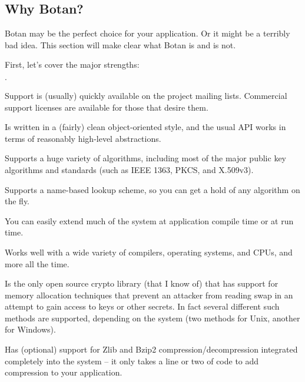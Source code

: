 \documentclass{article}
\begin{document}
\subsection{Why Botan?}

Botan may be the perfect choice for your application. Or it might be a
terribly bad idea. This section will make clear what Botan is
and is not.

First, let's cover the major strengths:

\begin{list}{$\cdot$}
  \item Support is (usually) quickly available on the project mailing lists.
        Commercial support licenses are available for those that desire them.

  \item
  \item Is written in a (fairly) clean object-oriented style, and the usual
        API works in terms of reasonably high-level abstractions.

  \item Supports a huge variety of algorithms, including most of the major
        public key algorithms and standards (such as IEEE 1363, PKCS, and
        X.509v3).

  \item Supports a name-based lookup scheme, so you can get a hold of any
        algorithm on the fly.

  \item You can easily extend much of the system at application compile time or
        at run time.

  \item Works well with a wide variety of compilers, operating systems, and
        CPUs, and more all the time.

  \item Is the only open source crypto library (that I know of) that has
        support for memory allocation techniques that prevent an attacker from
        reading swap in an attempt to gain access to keys or other secrets. In
        fact several different such methods are supported, depending on the
        system (two methods for Unix, another for Windows).

  \item Has (optional) support for Zlib and Bzip2 compression/decompression
        integrated completely into the system -- it only takes a line or two of
        code to add compression to your application.
\end{list}
\end{document}
